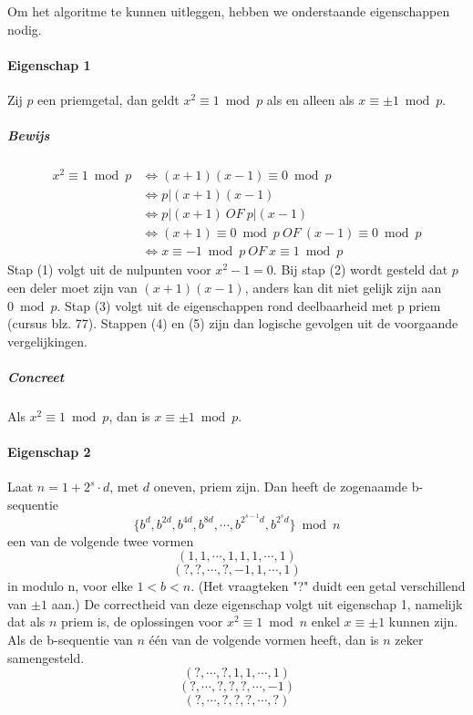 \documentclass[11pt]{article}
\begin{document}
Om het algoritme te kunnen uitleggen, hebben we onderstaande eigenschappen nodig.

\paragraph{Eigenschap 1}
Zij $p$ een priemgetal, dan geldt $x^2 \equiv 1 \bmod{p}$ als en alleen als $x \equiv \pm 1 \bmod{p}$.

\subparagraph{Bewijs}
	\begin{align}
	x^2 \equiv 1 \bmod{p} &\Leftrightarrow  (x+1)(x-1) \equiv 0 \bmod{p}\\
	&\Leftrightarrow p|(x+1)(x-1)\\
	&\Leftrightarrow p|(x+1) \ OF\ p|(x-1)\\
	&\Leftrightarrow (x+1) \equiv 0 \bmod{p} \ OF\ (x-1) \equiv 0 \bmod{p}\\
	&\Leftrightarrow x \equiv -1 \bmod{p} \ OF\ x \equiv 1 \bmod{p}
	\end{align}
Stap (1) volgt uit de nulpunten voor $x^2 - 1 = 0$. Bij stap (2) wordt gesteld dat $p$ een deler moet zijn van 		$(x+1)(x-1)$, anders kan dit niet gelijk zijn aan $0 \bmod{p}$. Stap (3) volgt uit de eigenschappen rond deelbaarheid met p priem (cursus blz. 77). Stappen (4) en (5) zijn dan logische gevolgen uit de voorgaande vergelijkingen.
	
\subparagraph{Concreet}
Als $x^2 \equiv 1 \bmod{p}$, dan is $x \equiv \pm 1 \bmod{p}$.

\pagebreak

\paragraph{Eigenschap 2}
Laat $n = 1+2^s \cdot d$, met $d$ oneven, priem zijn. Dan heeft de zogenaamde b-sequentie
$$\{b^d, b^{2d}, b^{4d}, b^{8d}, \cdots, b^{2^{s-1}d}, b^{2^sd}\} \bmod n$$
een van de volgende twee vormen
$$(1, 1, \cdots, 1, 1, 1, \cdots, 1)$$
$$(?, ?, \cdots, ?, -1, 1, \cdots, 1)$$
in modulo n, voor elke $1<b<n$. (Het vraagteken "?" duidt een getal verschillend van $\pm1$ aan.)
De correctheid van deze eigenschap volgt uit eigenschap 1, namelijk dat als $n$ priem is, de oplossingen voor $x^2 \equiv 1 \bmod{n}$ enkel $x \equiv \pm1$ kunnen zijn. Als de b-sequentie van $n$ één van de volgende vormen heeft, dan is $n$ zeker samengesteld.
$$(?, \cdots, ?, 1, 1, \cdots, 1)$$
$$(?, \cdots, ?, ?, ?, \cdots, -1)$$
$$(?, \cdots, ?, ?, ?, \cdots, ?)$$
\end{document}
